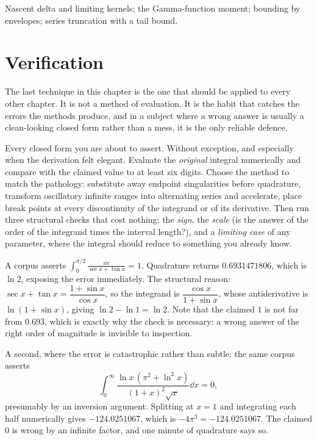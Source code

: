 \begin{seealsob}Nascent delta and limiting kernels; the Gamma-function moment; bounding by envelopes; series truncation with a tail bound.\end{seealsob}

\section{Verification}

The last technique in this chapter is the one that should be applied to every other chapter. It is not a method of evaluation. It is the habit that catches the errors the methods produce, and in a subject where a wrong answer is usually a clean-looking closed form rather than a mess, it is the only reliable defence.

\cue Every closed form you are about to assert. Without exception, and especially when the derivation felt elegant.
\method Evaluate the \emph{original} integral numerically and compare with the claimed value to at least six digits. Choose the method to match the pathology: substitute away endpoint singularities before quadrature, transform oscillatory infinite ranges into alternating series and accelerate, place break points at every discontinuity of the integrand or of its derivative. Then run three structural checks that cost nothing: the \emph{sign}, the \emph{scale} (is the answer of the order of the integrand times the interval length?), and a \emph{limiting case} of any parameter, where the integral should reduce to something you already know.

\begin{worked}
A corpus asserts $\displaystyle\int_0^{\pi/2}\frac{\dd x}{\sec x+\tan x}=1$. Quadrature returns $0.6931471806$, which is $\ln2$, exposing the error immediately. The structural reason: $\sec x+\tan x=\dfrac{1+\sin x}{\cos x}$, so the integrand is $\dfrac{\cos x}{1+\sin x}$, whose antiderivative is $\ln(1+\sin x)$, giving $\ln2-\ln1=\ln2$. Note that the claimed $1$ is not far from $0.693$, which is exactly why the check is necessary: a wrong answer of the right order of magnitude is invisible to inspection.

A second, where the error is catastrophic rather than subtle: the same corpus asserts
\[\int_0^{\infty}\frac{\ln x\,(\pi^{2}+\ln^{2}x)}{(1+x)^{2}\sqrt x}\dd x=0,\]
presumably by an inversion argument. Splitting at $x=1$ and integrating each half numerically gives $-124.0251067$, which is $-4\pi^{3}=-124.0251067$. The claimed $0$ is wrong by an infinite factor, and one minute of quadrature says so.
\end{worked}

